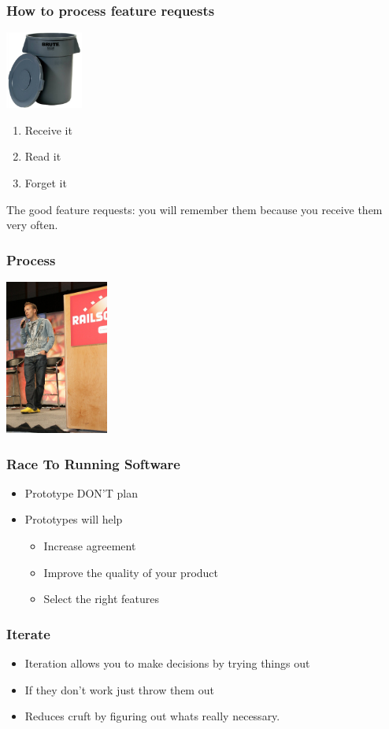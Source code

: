 \documentclass[10pt]{beamer}
\begin{document}
\begin{frame}
  \frametitle{How to process feature requests}
  \includegraphics[height=1in]{trashcan}
  \pause

  \begin{enumerate}
    \item Receive it
      \pause
    \item Read it
      \pause
    \item Forget it
      \pause
  \end{enumerate}
  The good feature requests: you will remember them because you receive them very often.
\end{frame}
\begin{frame}
  \frametitle{Process}
  \includegraphics[height=2in]{dhh-railsconf}
\end{frame}
\begin{frame}
  \frametitle{Race To Running Software}
  \pause
  \begin{itemize}
  \item Prototype DON'T plan
    \pause
  \item Prototypes will help
    \begin{itemize}
      \pause
    \item Increase agreement
      \pause
    \item Improve the quality of your product
      \pause
    \item Select the right features
    \end{itemize}
  \end{itemize}
\end{frame}
\begin{frame}
  \frametitle{Iterate}
  \pause
  \begin{itemize}
  \item Iteration allows you to make decisions by trying things out
    \pause
  \item If they don't work just throw them out
    \pause
  \item Reduces cruft by figuring out whats really necessary.
  \end{itemize}
\end{frame}
\end{document}
